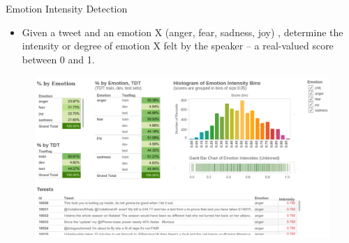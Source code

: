 \documentclass[handout]{beamer}
\begin{document}
\begin{frame}{Emotion Intensity Detection}
\begin{scriptsize}
\begin{scriptsize}
\begin{itemize}
\item Given a tweet and an emotion X (anger, fear, sadness, joy) , determine the intensity or degree of emotion X felt by the speaker -- a real-valued score between 0 and 1.
\end{itemize} 

\end{scriptsize}



     \begin{figure}[h]
        	\includegraphics[scale = 0.25]{pics/emoint.png}
        \end{figure} 
 
 
\end{scriptsize}

\end{frame}


%
%
%
%
%
\end{document}
